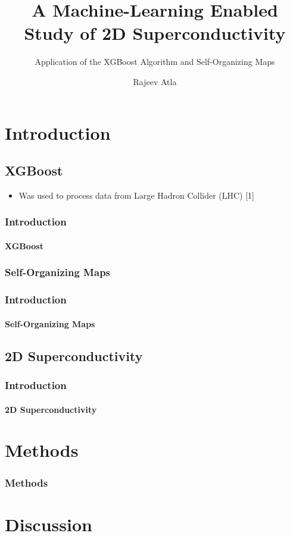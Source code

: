 \documentclass[12pt]{beamer}
\title{A Machine-Learning Enabled Study of 2D Superconductivity}
\subtitle{Application of the XGBoost Algorithm and Self-Organizing Maps}
\author[Rajeev Atla]
{Rajeev Atla}
\institute[JPS]
{
  John P. Stevens High School
}
\begin{document}
\frame{\titlepage}

\section{Introduction}
\subsection{XGBoost}

\begin{itemize}
  \item Was used to process data from Large Hadron Collider (LHC) [1]
\end{itemize}

\begin{frame}
\frametitle{Introduction}
\framesubtitle{XGBoost}


\end{frame}

\subsubsection{Self-Organizing Maps}

\begin{frame}
\frametitle{Introduction}
\framesubtitle{Self-Organizing Maps}

\end{frame}

\subsection{2D Superconductivity}

\begin{frame}
\frametitle{Introduction}
\framesubtitle{2D Superconductivity}

\end{frame}




\section{Methods}

\begin{frame}
\frametitle{Methods}

\end{frame}



\section{Discussion}
\end{document}
